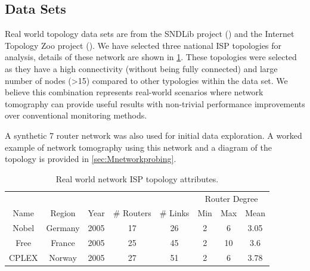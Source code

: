 \subsection{Data Sets}
\label{ssec:Mdatasets}
Real world topology data sets are from the SNDLib project (\cite{orlowski_sndlib_2007}) and the Internet Topology Zoo project (\cite{knight_internet_2011}). We have selected three national ISP topologies for analysis, details of these network are shown in \cref{tbl:Mrealnetworkattributes}. These topologies were selected as they have a high connectivity (without being fully connected) and large number of nodes (>15) compared to other typologies within the data set. We believe this combination represents real-world scenarios where network tomography can provide useful results with non-trivial performance improvements over conventional monitoring methods.\par
A synthetic 7 router network was also used for initial data exploration. A worked example of network tomography using this network and a diagram of the topology is provided in \cref{sec:Mnetworkprobing}.\par
  \begin{table}
    \centering
    \begin{tabular}{@{}cccccccc@{}} 
      \toprule
      &&&&&\multicolumn{3}{c}{Router Degree}\\
      \cmidrule{6-8}
      Name & Region & Year & \# Routers & \# Links & Min & Max & Mean \\
      \midrule
      Nobel & Germany & 2005 & 17 & 26 & 2 & 6 & 3.05\\
      Free & France & 2005 & 25 & 45 & 2 & 10 & 3.6\\
      CPLEX & Norway & 2005 & 27 & 51 & 2 & 6 & 3.78\\
      \bottomrule
    \end{tabular}
    \caption{Real world network ISP topology attributes.}
    \label{tbl:Mrealnetworkattributes}
  \end{table}


